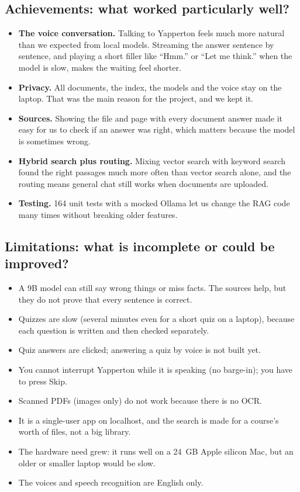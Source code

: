 \documentclass[11pt,a4paper]{article}
\begin{document}
\subsection*{Achievements: what worked particularly well?}

\begin{itemize}[leftmargin=*]
  \item \textbf{The voice conversation.} Talking to Yapperton feels much more
        natural than we expected from local models. Streaming the answer
        sentence by sentence, and playing a short filler like ``Hmm.'' or
        ``Let me think.'' when the model is slow, makes the waiting feel shorter.
  \item \textbf{Privacy.} All documents, the index, the models and the voice
        stay on the laptop. That was the main reason for the project, and we
        kept it.
  \item \textbf{Sources.} Showing the file and page with every document answer
        made it easy for us to check if an answer was right, which matters
        because the model is sometimes wrong.
  \item \textbf{Hybrid search plus routing.} Mixing vector search with keyword
        search found the right passages much more often than vector search
        alone, and the routing means general chat still works when documents
        are uploaded.
  \item \textbf{Testing.} 164 unit tests with a mocked Ollama let us change
        the RAG code many times without breaking older features.
\end{itemize}

\subsection*{Limitations: what is incomplete or could be improved?}

\begin{itemize}[leftmargin=*]
  \item A 9B model can still say wrong things or miss facts. The sources help,
        but they do not prove that every sentence is correct.
  \item Quizzes are slow (several minutes even for a short quiz on a laptop),
        because each question is written and then checked separately.
  \item Quiz answers are clicked; answering a quiz by voice is not built yet.
  \item You cannot interrupt Yapperton while it is speaking (no barge-in); you
        have to press Skip.
  \item Scanned PDFs (images only) do not work because there is no OCR.
  \item It is a single-user app on localhost, and the search is made for a
        course's worth of files, not a big library.
  \item The hardware need grew: it runs well on a 24~GB Apple silicon Mac, but
        an older or smaller laptop would be slow.
  \item The voices and speech recognition are English only.
\end{itemize}
\end{document}
